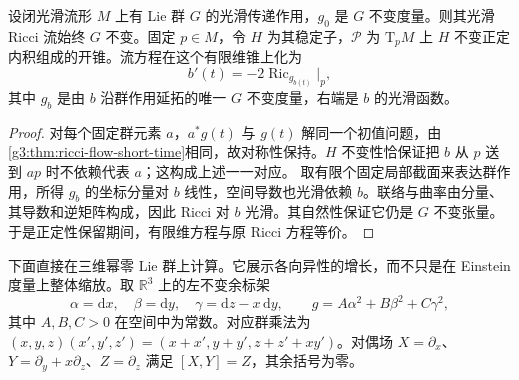 \begin{proposition}\label{g3:prop:ricci-flow-homogeneous-reduction}
	设闭光滑流形 \(M\) 上有 Lie 群 \(G\) 的光滑传递作用，\(g_0\) 是 \(G\) 不变度量。则其光滑 Ricci 流始终 \(G\) 不变。固定 \(p\in M\)，令 \(H\) 为其稳定子，\(\mathcal P\) 为 \(\mathrm T_pM\) 上 \(H\) 不变正定内积组成的开锥。流方程在这个有限维锥上化为
	\[
		b'(t)=-2\operatorname{Ric}_{g_{b(t)}}|_p,
	\]
	其中 \(g_b\) 是由 \(b\) 沿群作用延拓的唯一 \(G\) 不变度量，右端是 \(b\) 的光滑函数。
\end{proposition}
\begin{proof}
	对每个固定群元素 \(a\)，\(a^*g(t)\) 与 \(g(t)\) 解同一个初值问题，由\cref{g3:thm:ricci-flow-short-time}相同，故对称性保持。\(H\) 不变性恰保证把 \(b\) 从 \(p\) 送到 \(ap\) 时不依赖代表 \(a\)；这构成上述一一对应。
	取有限个固定局部截面来表达群作用，所得 \(g_b\) 的坐标分量对 \(b\) 线性，空间导数也光滑依赖 \(b\)。联络与曲率由分量、其导数和逆矩阵构成，因此 Ricci 对 \(b\) 光滑。其自然性保证它仍是 \(G\) 不变张量。于是正定性保留期间，有限维方程与原 Ricci 方程等价。
\end{proof}

下面直接在三维幂零 Lie 群上计算。它展示各向异性的增长，而不只是在 Einstein 度量上整体缩放。取 \(\mathbb R^3\) 上的左不变余标架
\[
	\alpha=\mathrm dx,\quad\beta=\mathrm dy,\quad
	\gamma=\mathrm dz-x\,\mathrm dy,
	\qquad g=A\alpha^2+B\beta^2+C\gamma^2,
\]
其中 \(A,B,C>0\) 在空间中为常数。对应群乘法为
\((x,y,z)(x',y',z')=(x+x',y+y',z+z'+xy')\)。对偶场
\(X=\partial_x\)、\(Y=\partial_y+x\partial_z\)、\(Z=\partial_z\) 满足 \([X,Y]=Z\)，其余括号为零。

